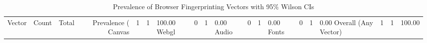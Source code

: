 \begin{table}[htbp]
\centering
\caption{Prevalence of Browser Fingerprinting Vectors with 95\% Wilson CIs}
\label{tab:prevalence_summary}
\begin{tabular}{lrrrrr}
\hline
Vector & Count & Total & Prevalence (%
\hline
Canvas & 1 & 1 & 100.00%
Webgl & 0 & 1 & 0.00%
Audio & 0 & 1 & 0.00%
Fonts & 0 & 1 & 0.00%
Overall (Any Vector) & 1 & 1 & 100.00%
\hline
\end{tabular}
\end{table}
